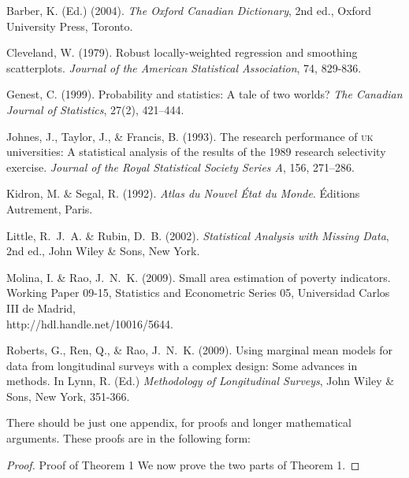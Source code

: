 \documentclass[12pt]{TD-CJS}
\begin{document}
\begin{thebibliography}{}
Barber, K. (Ed.) (2004). {\it The Oxford Canadian Dictionary}, 2nd ed., 
Oxford University Press, Toronto.

Cleveland, W. (1979). Robust locally-weighted regression and smoothing scatterplots. 
{\it Journal of the American Statistical Association}, 74, 829-836.

Genest, C. (1999). Probability and statistics: A tale of two worlds? 
{\it The Canadian Journal of Statistics}, 27(2), 421--444.

Johnes, J., Taylor, J., \& Francis, B. (1993). The research
performance of \textsc{uk} universities: A statistical analysis of the results
of the 1989 research selectivity exercise. {\it Journal of the Royal
Statistical Society Series A}, 156, 271--286.

Kidron, M. \& Segal, R. (1992). {\it Atlas du Nouvel \'Etat
du Monde}. \'Editions Autrement, Paris.

Little, R.~J.~A. \& Rubin, D.~B. (2002). {\it Statistical Analysis with Missing Data}, 2nd ed., 
John Wiley \& Sons, New York.

Molina, I. \& Rao, J.~N.~K. (2009). Small area estimation of poverty indicators. Working Paper 09-15, Statistics and Econometric Series 05, Universidad Carlos III de Madrid, \\http://hdl.handle.net/10016/5644.

Roberts, G., Ren, Q., \& Rao, J.~N.~K. (2009). 
Using marginal mean models for data from longitudinal surveys
with a complex design: Some advances in methods. In Lynn, R. (Ed.) {\it Methodology of Longitudinal Surveys}, 
John Wiley \& Sons, New York, 351-366.
\end{thebibliography}

\begin{appendix}
There should be just one appendix, for proofs and longer
mathematical arguments. These proofs are in the following form:

\begin{proof}{Proof of Theorem 1}{}%
We now prove the two parts of Theorem 1.
\end{proof}
\end{appendix}

\CJShistory
\end{document}
